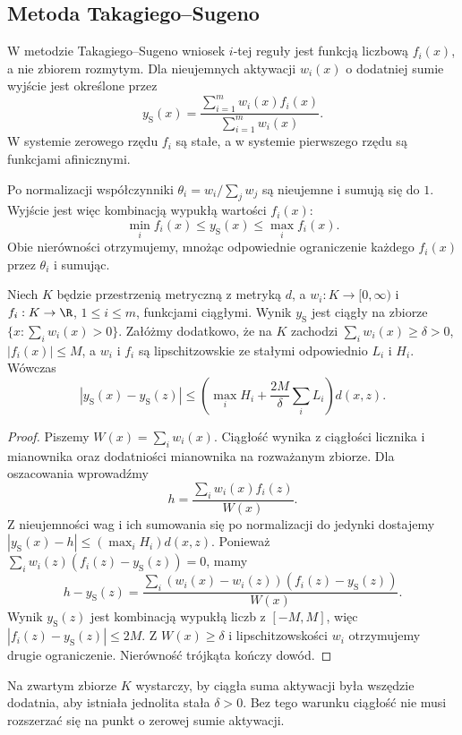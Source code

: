 \subsection{Metoda Takagiego--Sugeno}
\begin{definicja}\label{def:lst-fuzzy-sugeno}
W metodzie Takagiego--Sugeno wniosek $i$-tej reguły
jest funkcją liczbową $f_i(x)$, a nie zbiorem rozmytym.
Dla nieujemnych aktywacji $w_i(x)$ o dodatniej sumie
wyjście jest określone przez
\[
 y_{\mathrm S}(x)=
 \frac{\sum_{i=1}^m w_i(x)f_i(x)}{\sum_{i=1}^m w_i(x)}.
\]
W systemie zerowego rzędu $f_i$ są stałe,
a w systemie pierwszego rzędu są funkcjami afinicznymi.
\end{definicja}
Po normalizacji współczynniki
$\theta_i=w_i/\sum_jw_j$ są nieujemne i sumują się do $1$.
Wyjście jest więc kombinacją wypukłą wartości $f_i(x)$:
\[
 \min_i f_i(x)\leq y_{\mathrm S}(x)\leq\max_i f_i(x).
\]
Obie nierówności otrzymujemy, mnożąc odpowiednie
ograniczenie każdego $f_i(x)$ przez $\theta_i$ i sumując.

\begin{twierdzenie}
\label{thm:ncl-sugeno-stability}
Niech $K$ będzie przestrzenią metryczną z metryką $d$,
a $w_i:K\to[0,\infty)$ i $f_i:K\to\R$,
$1\leq i\leq m$, funkcjami ciągłymi.
Wynik $y_{\mathrm S}$ jest ciągły na zbiorze
$\{x:\sum_i w_i(x)>0\}$.
Załóżmy dodatkowo, że na $K$ zachodzi
$\sum_i w_i(x)\geq\delta>0$, $|f_i(x)|\leq M$,
a $w_i$ i $f_i$ są lipschitzowskie ze stałymi
odpowiednio $L_i$ i $H_i$. Wówczas
\[
 |y_{\mathrm S}(x)-y_{\mathrm S}(z)|
 \leq \left(\max_i H_i+
       \frac{2M}{\delta}\sum_i L_i\right)d(x,z).
\]
\end{twierdzenie}
\begin{proof}
Piszemy $W(x)=\sum_iw_i(x)$.
Ciągłość wynika z ciągłości licznika i mianownika
oraz dodatniości mianownika na rozważanym zbiorze.
Dla oszacowania wprowadźmy
\[
 h=\frac{\sum_i w_i(x)f_i(z)}{W(x)}.
\]
Z nieujemności wag i ich sumowania się po
normalizacji do jedynki dostajemy
$|y_{\mathrm S}(x)-h|\leq(\max_i H_i)d(x,z)$.
Ponieważ $\sum_i w_i(z)(f_i(z)-y_{\mathrm S}(z))=0$,
mamy
\[
 h-y_{\mathrm S}(z)
 =\frac{\sum_i(w_i(x)-w_i(z))
            (f_i(z)-y_{\mathrm S}(z))}{W(x)}.
\]
Wynik $y_{\mathrm S}(z)$ jest kombinacją wypukłą
liczb z $[-M,M]$, więc
$|f_i(z)-y_{\mathrm S}(z)|\leq2M$.
Z $W(x)\geq\delta$ i lipschitzowskości $w_i$
otrzymujemy drugie ograniczenie.
Nierówność trójkąta kończy dowód.
\end{proof}
Na zwartym zbiorze $K$ wystarczy, by ciągła suma
aktywacji była wszędzie dodatnia, aby istniała
jednolita stała $\delta>0$.
Bez tego warunku ciągłość nie musi rozszerzać się
na punkt o zerowej sumie aktywacji.

